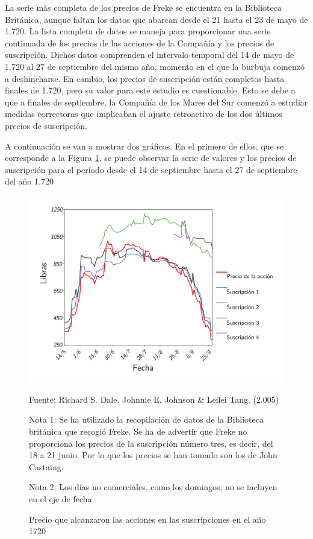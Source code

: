 La serie más completa de los precios de Freke se encuentra en la Biblioteca Británica, aunque faltan los datos que abarcan desde el 21 hasta el 23 de mayo de 1.720. La lista completa de datos se maneja para proporcionar una serie continuada de los precios de las acciones de la Compañía y los precios de suscripción. Dichos datos comprenden el intervalo temporal del 14 de mayo de 1.720 al 27 de septiembre del mismo año, momento en el que la burbuja comenzó a deshincharse. En cambio, los precios de suscripción están completos hasta finales de 1.720, pero su valor para este estudio es cuestionable. Esto se debe a que a finales de septiembre, la Compañía de los Mares del Sur comenzó a estudiar medidas correctoras que implicaban el ajuste retroactivo de los dos últimos precios de suscripción. 

A continuación se van a mostrar dos gráficos. En el primero de ellos, que se corresponde a la Figura \ref{fig:precioSuscripciones}, se puede observar la serie de valores y los precios de suscripción para el período desde el 14 de septiembre hasta el 27 de septiembre del año 1.720

\begin{figure}[h!]
	\caption{Precio que alcanzaron las acciones en las suscripciones en el año 1720}
	\centering
	\includegraphics[width=150mm]{capitulos/graficos/precioSuscripciones}
	\label{fig:precioSuscripciones} 
	
	\footnotesize
	Fuente: Richard S. Dale, Johnnie E. Johnson \& Leilei Tang. (2.005)
	
	\raggedright
	\vspace{3 mm}
	Nota 1: Se ha utilizado la recopilación de datos de la Biblioteca británica que recogió Freke. Se ha de advertir que Freke no proporciona los precios de la suscripción número tres, es decir, del 18 a 21 junio. Por lo que los precios se han tomado son los de John Castaing. 
	
	\vspace{3 mm}
	Nota 2: Los días no comerciales, como los domingos, no se incluyen en el eje de fecha

\end{figure}

